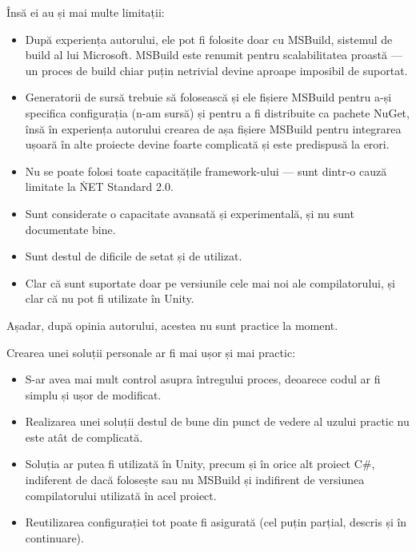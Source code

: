 \documentclass{report}
\begin{document}
Însă ei au și mai multe limitații:

\begin{itemize}

  \item După experiența autorului, ele pot fi folosite doar cu MSBuild, sistemul de build al lui Microsoft.
  MSBuild este renumit pentru scalabilitatea proastă --- un proces de build chiar puțin netrivial devine aproape imposibil de suportat.

  \item Generatorii de sursă trebuie să folosească și ele fișiere MSBuild pentru a-și specifica configurația (n-am sursă) și pentru a fi distribuite ca pachete NuGet, 
    însă în experiența autorului crearea de așa fișiere MSBuild pentru integrarea ușoară în alte proiecte devine foarte complicată și este predispusă la erori.

  \item Nu se poate folosi toate capacitățile framework-ului --- sunt dintr-o cauză limitate la \. NET Standard 2.0.

  \item Sunt considerate o capacitate avansată și experimentală, și nu sunt documentate bine.

  \item Sunt destul de dificile de setat și de utilizat.
    
  \item Clar că sunt suportate doar pe versiunile cele mai noi ale compilatorului, și clar că nu pot fi utilizate în Unity.

\end{itemize}

Așadar, după opinia autorului, acestea nu sunt practice la moment.

Crearea unei soluții personale ar fi mai ușor și mai practic:

\begin{itemize}
  \item S-ar avea mai mult control asupra întregului proces, deoarece codul ar fi simplu și ușor de modificat.

  \item Realizarea unei soluții destul de bune din punct de vedere al uzului practic nu este atât de complicată.
  
  \item Soluția ar putea fi utilizată în Unity, precum și în orice alt proiect C#, indiferent de dacă folosește sau nu MSBuild și indifirent de versiunea compilatorului utilizată în acel proiect.
  
  \item Reutilizarea configurației tot poate fi asigurată (cel puțin parțial, descris și în continuare). 
\end{itemize}
\end{document}
